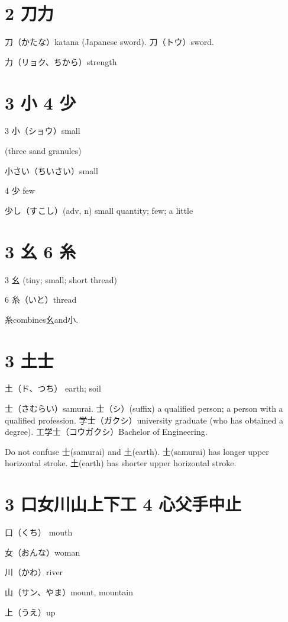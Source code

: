 \section{2 刀力}

刀（かたな）katana (Japanese sword).
刀（トウ）sword.

力（リョク、ちから）strength

\section{3 小 4 少}

3 小（ショウ）small

(three sand granules)

小さい（ちいさい）small

4 少 few

少し（すこし）(adv, n) small quantity; few; a little

\section{3 幺 6 糸}

3 幺 (tiny; small; short thread)

6 糸（いと）thread

糸combines幺and小.

\section{3 土士}

土（ド、つち） earth; soil

士（さむらい）samurai.
士（シ）(suffix)
a qualified person;
a person with a qualified profession.
学士（ガクシ）university graduate (who has obtained a degree).
工学士（コウガクシ）Bachelor of Engineering.

Do not confuse 士(samurai) and 土(earth).
士(samurai) has longer upper horizontal stroke.
土(earth) has shorter upper horizontal stroke.

\section{3 口女川山上下工 4 心父手中止}

口（くち） mouth

女（おんな）woman

川（かわ）river

山（サン、やま）mount, mountain

上（うえ）up

